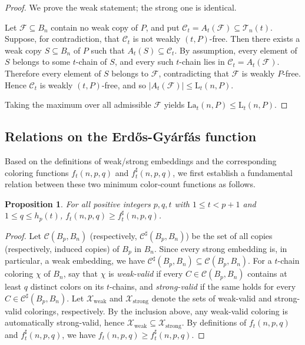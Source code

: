 \documentclass[twoside,12pt]{article}
\newtheorem{proposition}[theorem]{Proposition}
\newcommand{\LaT}{\mathrm{La}}
\newcommand{\LT}{\mathrm{L}}
\begin{document}
\begin{proof}
We prove the weak statement; the strong one is identical.

Let $\mathcal F\subseteq B_n$ contain no weak copy of $P$, and put $\mathcal C_t=A_t(\mathcal F)\subseteq \mathcal T_n(t)$. Suppose, for contradiction, that $\mathcal C_t$ is not weakly $(t,P)$-free. Then there exists a weak copy $S\subseteq B_n$ of $P$ such that $A_t(S)\subseteq \mathcal C_t$. By assumption, every element of $S$ belongs to some $t$-chain of $S$, and every such $t$-chain lies in $\mathcal C_t=A_t(\mathcal F)$. Therefore every element of $S$ belongs to $\mathcal F$, contradicting that $\mathcal F$ is weakly $P$-free. Hence $\mathcal C_t$ is weakly $(t,P)$-free, and so $|A_t(\mathcal F)|\le \LT_t(n,P)$.

Taking the maximum over all admissible $\mathcal F$ yields $\LaT_t(n,P)\le \LT_t(n,P)$.
\end{proof}

\subsection{Relations on the Erd\H{o}s-Gy\'{a}rf\'{a}s function}
\label{sec_2-3}

Based on the definitions of weak/strong embeddings and the corresponding coloring functions $f_t(n, p, q)$ and $f_t^{\sharp}(n, p, q)$, we first establish a fundamental relation between these two minimum color-count functions as follows.
\begin{proposition}\label{prop-ft-ftsharp-ineq}
For all positive integers $p, q, t$ with $1 \leq t < p+1$ and $1 \leq q \leq h_p(t)$,
$f_t(n, p, q) \geq f_t^{\sharp}(n, p, q)$.
\end{proposition}

\begin{proof}
Let $\mathcal{C}(B_p,B_n)$ (respectively, $\mathcal{C}^{\sharp}(B_p,B_n)$) be the set of all copies (respectively, induced copies) of $B_p$ in $B_n$.
Since every strong embedding is, in particular, a weak embedding, we have
$\mathcal{C}^{\sharp}(B_p,B_n)\subseteq \mathcal{C}(B_p,B_n)$.
For a $t$-chain coloring $\chi$ of $B_n$, say that $\chi$ is \emph{weak-valid} if every $C\in \mathcal{C}(B_p,B_n)$ contains at least $q$ distinct colors on its $t$-chains, and \emph{strong-valid} if the same holds for every $C\in \mathcal{C}^{\sharp}(B_p,B_n)$.
Let $\mathcal{X}_{\mathrm{weak}}$ and $\mathcal{X}_{\mathrm{strong}}$ denote the sets of weak-valid and strong-valid colorings, respectively.
By the inclusion above, any weak-valid coloring is automatically strong-valid, hence
$\mathcal{X}_{\mathrm{weak}}\subseteq \mathcal{X}_{\mathrm{strong}}$.
By definitions of $f_t(n,p,q)$ and $f_t^{\sharp}(n,p,q)$, we have $f_t(n,p,q)\ge f_t^{\sharp}(n,p,q)$.
\end{proof}
\end{document}
